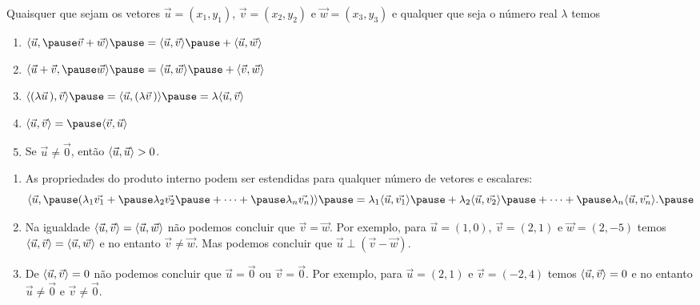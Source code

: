 \documentclass{beamer}
\begin{document}
\begin{frame}
    \begin{proposicao}
        Quaisquer que sejam os vetores $\vec{u} = (x_1, y_1)$, \pause $\vec{v} = (x_2, y_2)$ \pause e $\vec{w} = (x_3, y_3)$ \pause e qualquer que seja o
        número real $\lambda$ \pause temos\pause
        \begin{enumerate}[label=({\roman*})]
            \item $\langle \vec{u}, \pause \vec{v} + \vec{w}\rangle \pause = \inner{u}{v} \pause + \inner{u}{w}$\pause
            \item $\langle \vec{u} + \vec{v}, \pause \vec{w}\rangle \pause = \inner{u}{w} \pause + \inner{v}{w}$\pause
            \item $\langle (\lambda \vec{u}\,), \vec{v}\rangle \pause = \langle \vec{u}, (\lambda \vec{v}\,)\rangle \pause = \lambda\inner{u}{v}$\pause
            \item $\inner{u}{v} = \pause \inner{v}{u}$\pause
            \item Se $\vec{u} \ne \vec{0}$, \pause então $\langle \vec{u}, \vec{u} \rangle > 0$.
        \end{enumerate}
    \end{proposicao}
\end{frame}

\begin{frame}
    \begin{observacao}
        \begin{enumerate}[label=({\roman*})]
            \item As propriedades do produto interno \pause podem ser estendidas para qualquer número de vetores \pause e escalares:\pause
                  \[
                      \langle\vec{u}, \pause (\lambda_1\vec{v_1} + \pause \lambda_2\vec{v_2} \pause + \cdots + \pause \lambda_n\vec{v_n} )\rangle \pause =
                      \lambda_1\inner{u}{v_1} \pause + \lambda_2\inner{u}{v_2} \pause + \cdots + \pause \lambda_n\inner{u}{v_n}.\pause
                  \]
            \item Na igualdade $\langle \vec{u}, \vec{v} \rangle = \langle \vec{u}, \vec{w} \rangle$ \pause não podemos concluir que $\vec{v} = \vec{w}$. \pause Por exemplo, para $\vec{u} = (1, 0)$,
                  \pause $\vec{v} = (2, 1)$ \pause e $\vec{w} = (2, -5)$ \pause temos $\langle \vec{u}, \vec{v} \rangle = \langle \vec{u}, \vec{w} \rangle$ \pause e no entanto $\vec{v} \ne \vec{w}$.
                  \pause Mas podemos concluir que $\vec{u}\perp(\vec{v} - \vec{w})$.\pause
            \item De $\langle \vec{u}, \vec{v} \rangle = 0$ \pause não podemos concluir que $\vec{u} = \vec{0}$ \pause ou $\vec{v} = \vec{0}$. \pause Por exemplo, para $\vec{u} =
                      (2, 1)$ \pause e $\vec{v} = (-2, 4)$ \pause temos $\langle \vec{u}, \vec{v} \rangle = 0$ \pause e no entanto $\vec{u} \ne \vec{0}$ \pause e $\vec{v} \ne \vec{0}$.
        \end{enumerate}
    \end{observacao}
\end{frame}
\end{document}
